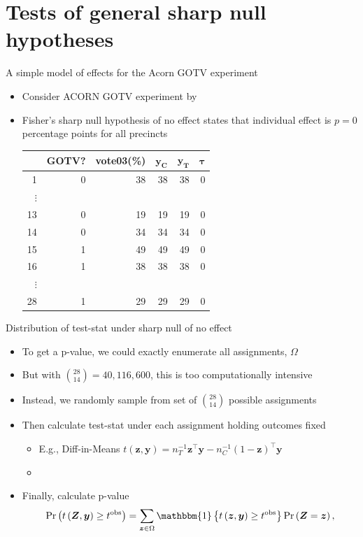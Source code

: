 \documentclass[table, xcolor = {dvipsnames}, 9pt]{beamer}
\theoremstyle{plain}
\newcommand{\mh}[1]{{\color{magenta}{#1}}}
\begin{document}
\section{Tests of general sharp null hypotheses}
\begin{frame}{A simple model of effects for the Acorn GOTV experiment}
\vfill
\begin{itemize}
\item Consider ACORN GOTV experiment by \citet{arceneaux2005} \vfill
\item Fisher's sharp null hypothesis of no effect states that individual effect is $p = 0$ percentage points for all precincts \vfill 
\begin{table}
  \begin{tabular}{r|rr|rrr}
  \hline
 & GOTV? & vote03(\%)& $\bm{y_C}$ & $\bm{y_T}$ & $\bm{\tau}$\\
  \hline
1 & 0 & 38 & 38 & 38 & 0 \\
$\vdots$& & & & & \\
13 & 0 & 19 & 19 & 19 & 0 \\
14 & 0 & 34 & 34 & 34 & 0 \\
15 & 1 & 49 & 49 & 49 & 0 \\
16 & 1 & 38 & 38 & 38 & 0 \\
$\vdots$& & & & & \\
28 & 1 & 29 & 29 & 29 & 0 \\
   \hline
\end{tabular}
\end{table}
\end{itemize}  
\end{frame}
\begin{frame}{Distribution of test-stat under sharp null of no effect}
\vfill
\begin{itemize}
\item To get a p-value, we could exactly enumerate all assignments, $\Omega$ \vfill
\item But with $\binom{28}{14} = 40,116,600$, this is too computationally intensive \vfill
\item Instead, we randomly sample from set of $\binom{28}{14}$ possible assignments \vfill
\item Then calculate test-stat under each assignment holding outcomes fixed \vfill
\begin{itemize} \vfill
\item[] E.g., Diff-in-Means $t\left(\bm{z}, \bm{y}\right) = n_T^{-1} \bm{z}^{\top}\bm{y} - n_C^{-1} \left(1 - \bm{z}\right)^{\top} \bm{y}$ \vfill
\item[] \mh{Note this test-stat is not same as one in Fisher's ``Lady Tasting Tea''} \vfill
\end{itemize} \vfill
\item Finally, calculate p-value \vfill
\begin{equation*}
\Pr\left(t\left(\bm{Z},\bm{y}\right) \geq t^{\text{obs}}\right) = \sum \limits_{\bm{z}\in \Omega} \mathbbm{1}\left\{t\left(\bm{z}, \bm{y}\right) \geq t^{\text{obs}}\right\} \Pr\left(\bm{Z} = \bm{z}\right),
\end{equation*} \vfill
\end{itemize}  \vfill
\end{frame}
\end{document}
